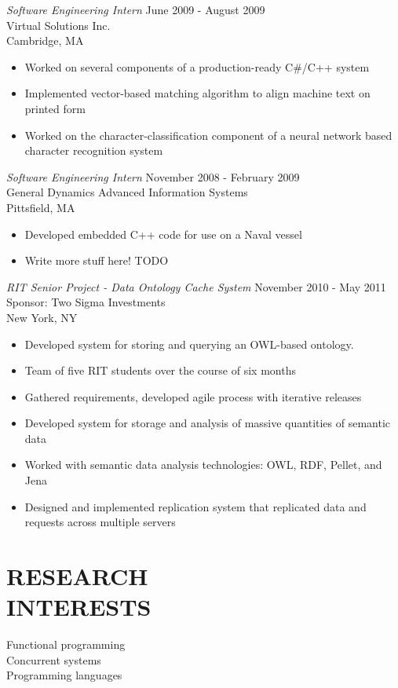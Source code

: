 \documentclass[margin]{res}
\begin{document}
\begin{resume}
                {\sl Software Engineering Intern} \hfill            June 2009 - August 2009 \\
                Virtual Solutions Inc. \\ 
                Cambridge, MA
                 \begin{itemize}  \itemsep -2pt %
                  \item Worked on several components of a production-ready C\#/C++ system
                  \item Implemented vector-based matching algorithm to align machine text on printed form
                  \item Worked on the character-classification component of a 
                    neural network based character recognition system
                 \end{itemize} 
                {\sl Software Engineering Intern} \hfill        November 2008 - February 2009 \\
                General Dynamics Advanced Information Systems \\
                Pittsfield, MA
                  \begin{itemize}  \itemsep -2pt
                   \item Developed embedded C++ code for use on a Naval vessel
                   \item Write more stuff here! TODO
                  \end{itemize} 
 
                {\sl RIT Senior Project - Data Ontology Cache System} \hfill November 2010 - May 2011 \\
                Sponsor: Two Sigma Investments \\
                New York, NY
                  \begin{itemize} \itemsep -2pt
                   \item Developed system for storing and querying an
                     OWL-based ontology.
                   \item Team of five RIT students over the course of six months
                   \item Gathered requirements, developed agile process with iterative releases
                   \item Developed system for storage and analysis of massive quantities 
                     of semantic data
                   \item Worked with semantic data analysis technologies:
                     OWL, RDF, Pellet, and Jena
                   \item Designed and implemented replication system that replicated data
                     and requests across multiple servers
                  \end{itemize}

\section{RESEARCH \\ INTERESTS}             
                 Functional programming \\
                 Concurrent systems \\
                 Programming languages
\end{resume}
\end{document}

